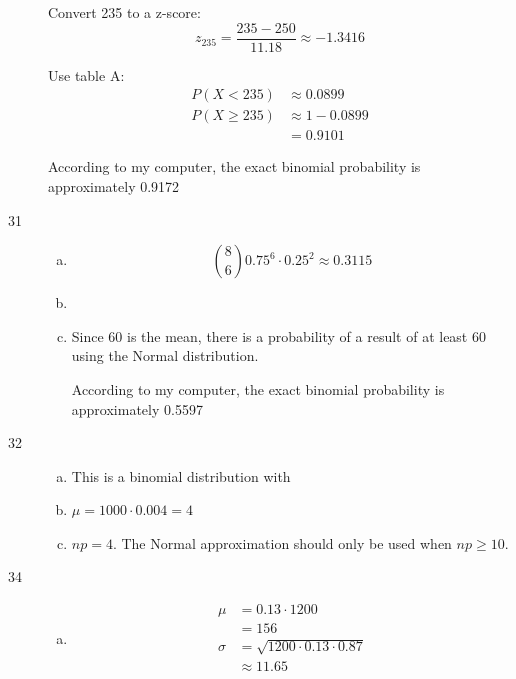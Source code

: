\documentclass[letterpaper, landscape]{exam}
\begin{document}
\begin{description}
        Convert 235 to a z-score:
        \[
          z_{235} = \frac{235 - 250}{11.18} \approx -1.3416
        \]

        Use table A:
        \begin{align*}
          P(X < 235)    & \approx 0.0899 \\
          P(X \geq 235) & \approx 1 - 0.0899 \\
                        & = \boxed{ 0.9101 }
        \end{align*}

        According to my computer, the exact binomial probability is
        approximately 0.9172

      \item[31]
        \begin{enumerate}[(a)]
          \item 
            \[
              \binom{8}{6} 0.75^6 \cdot 0.25^2 \approx \boxed{ 0.3115 } 
            \]

          \item {}

          \item Since 60 is the mean, there is a  probability of a
            result of at least 60 using the Normal distribution.

            According to my computer, the exact binomial probability is
            approximately 0.5597

        \end{enumerate}

      \item[32]
        \begin{enumerate}[(a)]
          \item This is a binomial distribution with 

          \item $\mu = 1000 \cdot 0.004 = \boxed{ 4 }$

          \item $np = 4$. The Normal approximation should only be used when 
            $np \geq 10$.
        \end{enumerate}

      \item[34]
        \begin{enumerate}[(a)]
          \item
            \begin{align*}
              \mu    & = 0.13 \cdot 1200 \\
                     & = \boxed{ 156 } \\
              \sigma & = \sqrt{1200 \cdot 0.13 \cdot 0.87} \\
                     & \approx \boxed{ 11.65 } \\
            \end{align*}


\end{enumerate}
\end{description}
\end{document}
